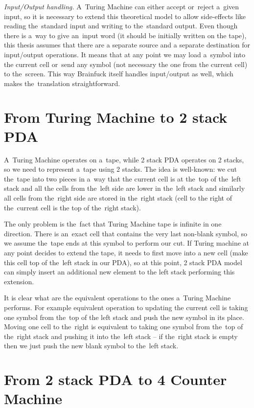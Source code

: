 \documentclass[english,shortabstract,mgr]{iithesis}
\begin{document}
\textit{Input/Output handling.}
A~Turing Machine can either accept or~reject a~given input, so it is necessary to
extend this theoretical model to allow side-effects like reading the~standard
input and writing to the~standard output. Even though there is a~way to give
an~input word (it should be initially written on the tape), this thesis assumes
that there are a separate source and a separate destination for input/output operations.
It means that at any point we may load a~symbol into the current cell or~send
any symbol (not necessary the one from the current cell) to the~screen. This
way Brainfuck itself handles input/output as well, which makes the~translation straightforward.

\section {From Turing Machine to 2 stack PDA}

A~Turing Machine operates on a~tape, while 2 stack PDA operates on 2 stacks, so we need
to represent a~tape using 2 stacks. The idea is well-known: we cut the~tape into
two pieces in a~way that the current cell is at the~top of the~left stack and all
the cells from the~left side are lower in the~left stack and similarly all cells from the~right side
are stored in the~right stack (cell to the right of the~current cell is the top of the~right stack).

The only problem is the~fact that Turing Machine tape is infinite in one direction.
There is an~exact cell that contains the very last non-blank symbol, so we assume the~tape
ends at this symbol to perform our cut. If Turing machine at any point decides to extend
the tape, it needs to first move into a new cell (make this cell top of the~left stack in our PDA),
so at this point, 2 stack PDA model can simply insert an additional new element to the left
stack performing this extension.

It is clear what are the equivalent operations to the ones a~Turing Machine performs.
For example equivalent operation to updating the current cell is taking one symbol from
the~top of the left stack and push the new symbol in its place. Moving one cell to the~right
is equivalent to taking one symbol from the~top of the~right stack and pushing it
into the~left stack -- if the~right stack is empty then we just push the new blank symbol
to the~left stack.

\section {From 2 stack PDA to 4 Counter Machine}
\end{document}
